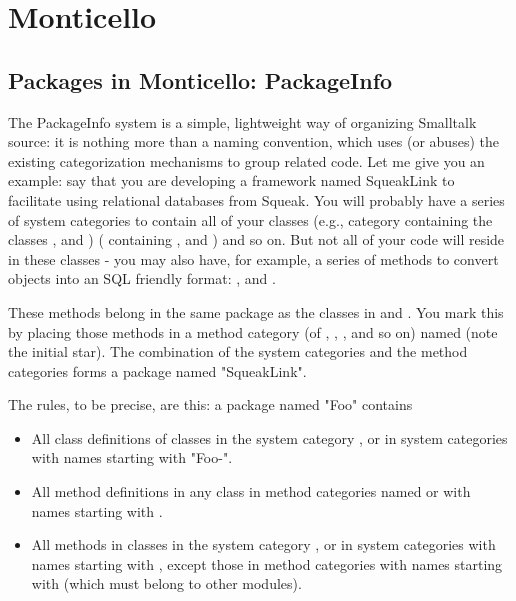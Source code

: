 \documentclass[a4paper,10pt,twoside]{book}
\begin{document}
	\renewcommand{\nnbb}[2]{} %
	\sloppy
\fi
\chapter{Monticello}

\section{Packages in Monticello: PackageInfo}

The PackageInfo system is a simple, lightweight way of organizing Smalltalk source: it is nothing more than a naming convention, which uses (or abuses) the existing categorization mechanisms to group related code. Let me give you an example: say that you are developing a framework named SqueakLink to facilitate using relational databases from Squeak. You will probably have a series of system categories to contain all of your classes (e.g., category  containing the classes ,  and )
( containing ,   and ) and so on. But not all of your code will reside in these classes - you may also have, for example, a series of methods to convert objects into an SQL friendly format: ,   and .

These methods belong in the same package as the classes in  and . You mark this by placing those methods in a method category (of , , , and so on) named  (note the initial star). The combination of the  system categories and the  method categories forms a package named "SqueakLink".

The rules, to be precise, are this: a package named "Foo" contains

\begin{itemize}
\item All class definitions of classes in the system category , or in system categories with names starting with "Foo-".
\item All method definitions in any class in method categories named  or with names starting with .
\item All methods in classes in the system category , or in system categories with names starting with , except those in method categories with names starting with \cat{*} (which must belong to other modules).
\end{itemize}
\end{document}
